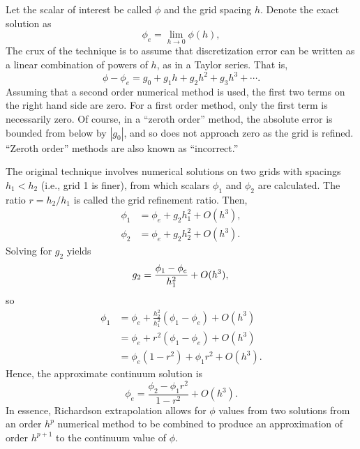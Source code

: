 \documentclass[ms,cpyr,lof,lot]{uathesis}
\begin{document}
Let the scalar of interest be called $\phi$ and the grid spacing $h$.
Denote the exact solution as
\begin{equation}
  \phi_e = \lim_{h \to 0} \phi(h),
\end{equation}
The crux of the technique is to assume that discretization error can be written as a linear combination of powers of $h$, as in a Taylor series.
That is,
\begin{equation}
  \phi - \phi_e = g_0 + g_1 h + g_2 h^2 + g_3 h^3 + \cdots.
\end{equation}
Assuming that a second order numerical method is used, the first two terms on the right hand side are zero.
For a first order method, only the first term is necessarily zero.
Of course, in a ``zeroth order'' method, the absolute error is bounded from below by $|g_0|$, and so does not approach zero as the grid is refined.
``Zeroth order'' methods are also known as ``incorrect.''

The original technique involves numerical solutions on two grids with spacings $h_1 < h_2$ (i.e., grid 1 is finer), from which scalars $\phi_1$ and $\phi_2$ are calculated.
The ratio $r = h_2/h_1$ is called the grid refinement ratio.
Then,
\begin{align*}
  \phi_1 &= \phi_e + g_2 h_1^2 + O(h^3), \\
  \phi_2 &= \phi_e + g_2 h_2^2 + O(h^3).
\end{align*}
Solving for $g_2$ yields
\begin{equation*}
  g_2 = \frac{\phi_1 - \phi_e}{h_1^2} + O(h^3), \\
\end{equation*}
so
\begin{align*}
  \phi_1 &= \phi_e + \frac{h_2^2}{h_1^2}(\phi_1 - \phi_e) + O(h^3) \\
  &=  \phi_e + r^2(\phi_1 - \phi_e) + O(h^3) \\
  &= \phi_e(1-r^2) + \phi_1 r^2 + O(h^3).
\end{align*}
Hence, the approximate continuum solution is
\begin{equation*}
  \phi_e = \frac{\phi_2 - \phi_1 r^2}{1 - r^2} + O(h^3).
\end{equation*}
In essence, Richardson extrapolation allows for $\phi$ values from two solutions from an order $h^p$ numerical method to be combined to produce an approximation of order $h^{p+1}$ to the continuum value of $\phi$.
\end{document}
